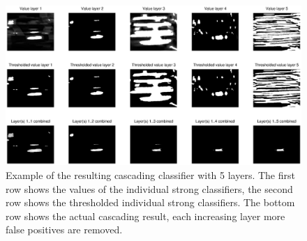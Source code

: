 \documentclass[a4paper,11pt]{article}
\begin{document}
\begin{figure}[!ht]
\centering
\includegraphics[width=16cm]{img/cascader_img14}
\caption{Example of the resulting cascading classifier with 5 layers. The first
row shows the values of the individual strong classifiers, the second row shows
the thresholded individual strong classifiers. The bottom row shows the actual
cascading result, each increasing layer more false positives are removed.}
\label{fig:cascader}
\end{figure}
\end{document}
